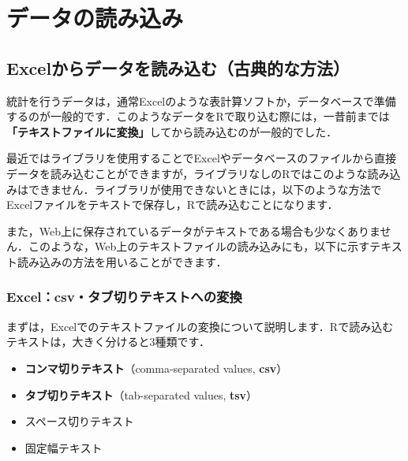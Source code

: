 \documentclass[
  letterpaper,
  DIV=11,
  numbers=noendperiod]{scrreprt}
\providecommand{\tightlist}{%
  \setlength{\itemsep}{0pt}\setlength{\parskip}{0pt}}\usepackage{longtable,booktabs,array}
\begin{document}
\hypertarget{ux30c7ux30fcux30bfux306eux8aadux307fux8fbcux307f}{%
\section{データの読み込み}\label{ux30c7ux30fcux30bfux306eux8aadux307fux8fbcux307f}}

\hypertarget{excelux304bux3089ux30c7ux30fcux30bfux3092ux8aadux307fux8fbcux3080ux53e4ux5178ux7684ux306aux65b9ux6cd5}{%
\subsection{Excelからデータを読み込む（古典的な方法）}\label{excelux304bux3089ux30c7ux30fcux30bfux3092ux8aadux307fux8fbcux3080ux53e4ux5178ux7684ux306aux65b9ux6cd5}}

統計を行うデータは，通常Excelのような表計算ソフトか，データベースで準備するのが一般的です．このようなデータをRで取り込む際には，一昔前までは\textbf{「テキストファイルに変換」}してから読み込むのが一般的でした．

最近ではライブラリを使用することでExcelやデータベースのファイルから直接データを読み込むことができますが，ライブラリなしのRではこのような読み込みはできません．ライブラリが使用できないときには，以下のような方法でExcelファイルをテキストで保存し，Rで読み込むことになります．

また，Web上に保存されているデータがテキストである場合も少なくありません．このような，Web上のテキストファイルの読み込みにも，以下に示すテキスト読み込みの方法を用いることができます．

\hypertarget{excelcsvux30bfux30d6ux5207ux308aux30c6ux30adux30b9ux30c8ux3078ux306eux5909ux63db}{%
\subsubsection{Excel：csv・タブ切りテキストへの変換}\label{excelcsvux30bfux30d6ux5207ux308aux30c6ux30adux30b9ux30c8ux3078ux306eux5909ux63db}}

まずは，Excelでのテキストファイルの変換について説明します．Rで読み込むテキストは，大きく分けると3種類です．

\begin{itemize}
\tightlist
\item
  \textbf{コンマ切りテキスト}（comma-separated values, \textbf{csv}）
\item
  \textbf{タブ切りテキスト}（tab-separated values, \textbf{tsv}）
\item
  スペース切りテキスト
\item
  固定幅テキスト
\end{itemize}
\end{document}
